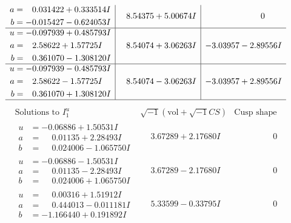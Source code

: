 \documentclass[1p]{elsarticle_modified}
\theoremstyle{definition}
\newcommand{\I}{\sqrt{-1}}
\begin{document}
$$\begin{array}{c|c|c}
\begin{aligned}
a &= \phantom{-}0.031422 + 0.333514 I \\
b &= -0.015427 - 0.624053 I\end{aligned}
 & \phantom{-}8.54375 + 5.00674 I & \phantom{-0.000000 } 0 \\ \hline\begin{aligned}
u &= -0.097939 + 0.485793 I \\
a &= \phantom{-}2.58622 + 1.57725 I \\
b &= \phantom{-}0.361070 - 1.308120 I\end{aligned}
 & \phantom{-}8.54074 + 3.06263 I & -3.03957 - 2.89556 I \\ \hline\begin{aligned}
u &= -0.097939 - 0.485793 I \\
a &= \phantom{-}2.58622 - 1.57725 I \\
b &= \phantom{-}0.361070 + 1.308120 I\end{aligned}
 & \phantom{-}8.54074 - 3.06263 I & -3.03957 + 2.89556 I\\
 \hline 
 \end{array}$$\newpage$$\begin{array}{c|c|c}  
\text{Solutions to }I^u_{1}& \I (\text{vol} + \sqrt{-1}CS) & \text{Cusp shape}\\
 \hline 
\begin{aligned}
u &= -0.06886 + 1.50531 I \\
a &= \phantom{-}0.01135 + 2.28493 I \\
b &= \phantom{-}0.024006 - 1.065750 I\end{aligned}
 & \phantom{-}3.67289 + 2.17680 I & \phantom{-0.000000 } 0 \\ \hline\begin{aligned}
u &= -0.06886 - 1.50531 I \\
a &= \phantom{-}0.01135 - 2.28493 I \\
b &= \phantom{-}0.024006 + 1.065750 I\end{aligned}
 & \phantom{-}3.67289 - 2.17680 I & \phantom{-0.000000 } 0 \\ \hline\begin{aligned}
u &= \phantom{-}0.00316 + 1.51912 I \\
a &= \phantom{-}0.444013 - 0.011181 I \\
b &= -1.166440 + 0.191892 I\end{aligned}
 & \phantom{-}5.33599 - 0.33795 I & \phantom{-0.000000 } 0 \\ \hline\begin{aligned}

\end{aligned}
\end{array}$$
\end{document}
